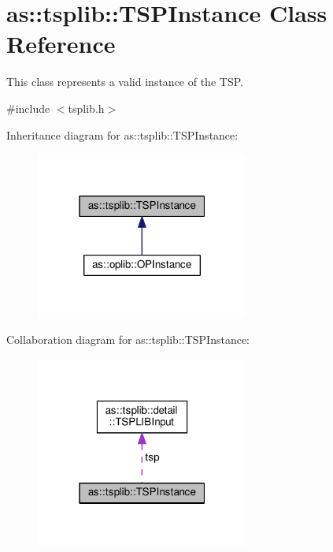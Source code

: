 \hypertarget{classas_1_1tsplib_1_1TSPInstance}{}\section{as\+:\+:tsplib\+:\+:T\+S\+P\+Instance Class Reference}
\label{classas_1_1tsplib_1_1TSPInstance}


This class represents a valid instance of the T\+SP.  




{\ttfamily \#include $<$tsplib.\+h$>$}



Inheritance diagram for as\+:\+:tsplib\+:\+:T\+S\+P\+Instance\+:
\nopagebreak
\begin{figure}[H]
\begin{center}
\leavevmode
\includegraphics[width=199pt]{classas_1_1tsplib_1_1TSPInstance__inherit__graph}
\end{center}
\end{figure}


Collaboration diagram for as\+:\+:tsplib\+:\+:T\+S\+P\+Instance\+:
\nopagebreak
\begin{figure}[H]
\begin{center}
\leavevmode
\includegraphics[width=199pt]{classas_1_1tsplib_1_1TSPInstance__coll__graph}
\end{center}
\end{figure}
